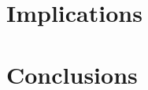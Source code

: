 \section{Implications}
\label{sec:ch2_implications}
    

\section{Conclusions} \label{sec:ch2_conclusions}
    
